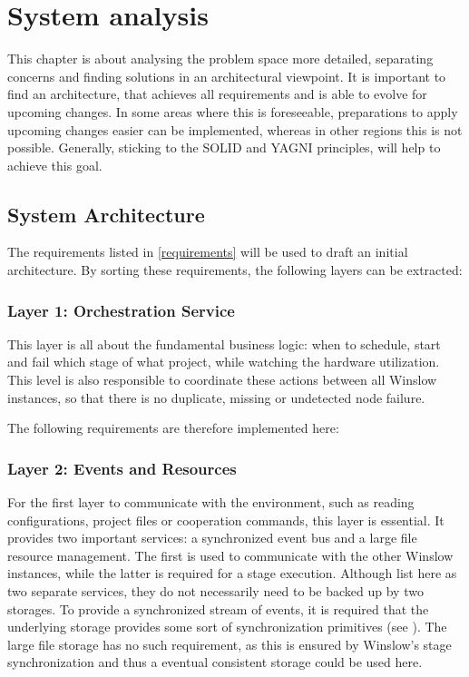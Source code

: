
\chapter{System analysis}

This chapter is about analysing the problem space more detailed, separating concerns and finding solutions in an architectural viewpoint.
It is important to find an architecture, that achieves all requirements and is able to evolve for upcoming changes.
In some areas where this is foreseeable, preparations to apply upcoming changes easier can be implemented, whereas in other regions this is not possible.
Generally, sticking to the SOLID and YAGNI principles, will help to achieve this goal.

\section{System Architecture}

The requirements listed in \autoref{requirements} will be used to draft an initial architecture.
By sorting these requirements, the following layers can be extracted: 

\subsection{Layer 1: Orchestration Service}

This layer is all about the fundamental business logic: when to schedule, start and fail which stage of what project, while watching the hardware utilization.
This level is also responsible to coordinate these actions between all Winslow instances, so that there is no duplicate, missing or undetected node failure.

The following requirements are therefore implemented here: 

\subsection{Layer 2: Events and Resources}

For the first layer to communicate with the environment, such as reading configurations, project files or cooperation commands, this layer is essential.
It provides two important services: a synchronized event bus and a large file resource management.
The first is used to communicate with the other Winslow instances, while the latter is required for a stage execution.
Although list here as two separate services, they do not necessarily need to be backed up by two storages.
To provide a synchronized stream of events, it is required that the underlying storage provides some sort of synchronization primitives (see ).
The large file storage has no such requirement, as this is ensured by Winslow's stage synchronization and thus a eventual consistent storage could be used here.

